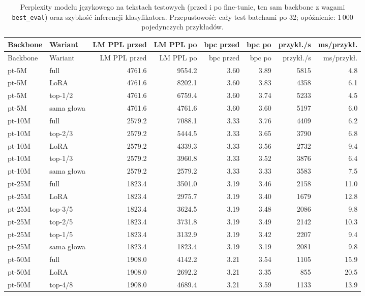 {\small\setlength{\tabcolsep}{4pt}\setlength{\LTcapwidth}{\linewidth}
\begin{longtable}{@{}llrrrrrr@{}}
\caption{Perplexity modelu językowego na tekstach testowych (przed i po fine-tunie, ten sam backbone z wagami \texttt{best\_eval}) oraz szybkość inferencji klasyfikatora. Przepustowość: cały test batchami po 32; opóźnienie: 1\,000 pojedynczych przykładów.}\label{tab:lm}\\
\toprule
Backbone & Wariant & LM PPL przed & LM PPL po & bpc przed & bpc po & przykł./s & ms/przykł. \\
\midrule
\endfirsthead
\toprule
Backbone & Wariant & LM PPL przed & LM PPL po & bpc przed & bpc po & przykł./s & ms/przykł. \\
\midrule
\endhead
\bottomrule
\endlastfoot
pt-5M & full & 4761.6 & 9554.2 & 3.60 & 3.89 & 5815 & 4.8 \\
pt-5M & LoRA & 4761.6 & 8202.1 & 3.60 & 3.83 & 4358 & 6.1 \\
pt-5M & top-1/2 & 4761.6 & 6759.4 & 3.60 & 3.74 & 5233 & 4.5 \\
pt-5M & sama głowa & 4761.6 & 4761.6 & 3.60 & 3.60 & 5197 & 6.0 \\
pt-10M & full & 2579.2 & 7088.1 & 3.33 & 3.76 & 4409 & 6.2 \\
pt-10M & top-2/3 & 2579.2 & 5444.5 & 3.33 & 3.65 & 3790 & 6.8 \\
pt-10M & LoRA & 2579.2 & 4339.3 & 3.33 & 3.56 & 2732 & 9.4 \\
pt-10M & top-1/3 & 2579.2 & 3960.8 & 3.33 & 3.52 & 3876 & 6.4 \\
pt-10M & sama głowa & 2579.2 & 2579.2 & 3.33 & 3.33 & 3583 & 7.5 \\
pt-25M & full & 1823.4 & 3501.0 & 3.19 & 3.46 & 2158 & 11.0 \\
pt-25M & LoRA & 1823.4 & 2975.7 & 3.19 & 3.40 & 1679 & 12.8 \\
pt-25M & top-3/5 & 1823.4 & 3624.5 & 3.19 & 3.48 & 2086 & 9.8 \\
pt-25M & top-2/5 & 1823.4 & 3731.8 & 3.19 & 3.49 & 2142 & 10.3 \\
pt-25M & top-1/5 & 1823.4 & 3132.9 & 3.19 & 3.42 & 2207 & 9.4 \\
pt-25M & sama głowa & 1823.4 & 1823.4 & 3.19 & 3.19 & 2081 & 9.8 \\
pt-50M & full & 1908.0 & 4142.2 & 3.21 & 3.54 & 1105 & 15.9 \\
pt-50M & LoRA & 1908.0 & 2692.2 & 3.21 & 3.35 & 855 & 20.5 \\
pt-50M & top-4/8 & 1908.0 & 4689.4 & 3.21 & 3.59 & 1133 & 13.9 \\

\end{longtable}}
